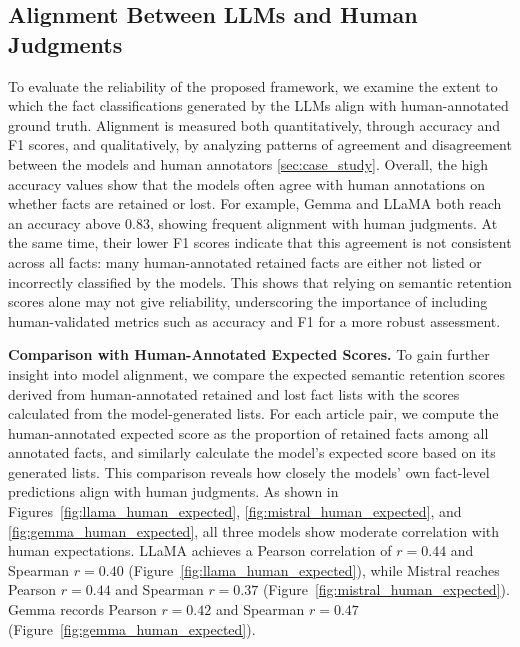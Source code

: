 \documentclass{DESSThesis}
\begin{document}
\vspace{-1.2em}
\subsection{Alignment Between LLMs and Human Judgments}
\label{sec:alignment_llm_human}
\vspace{-1em}
To evaluate the reliability of the proposed framework, we examine the extent to which the fact classifications generated by the LLMs align with human-annotated ground truth. Alignment is measured both quantitatively, through accuracy and F1 scores, and qualitatively, by analyzing patterns of agreement and disagreement between the models and human annotators \autoref{sec:case_study}.
Overall, the high accuracy values show that the models often agree with human annotations on whether facts are retained or lost. For example, Gemma and LLaMA both reach an accuracy above 0.83, showing frequent alignment with human judgments. At the same time, their lower F1 scores indicate that this agreement is not consistent across all facts: many human-annotated retained facts are either not listed or incorrectly classified by the models. This shows that relying on semantic retention scores alone may not give reliability, underscoring the importance of including human-validated metrics such as accuracy and F1 for a more robust assessment.

\indent\textbf{Comparison with Human-Annotated Expected Scores.}
To gain further insight into model alignment, we compare the expected semantic retention scores derived from human-annotated retained and lost fact lists with the scores calculated from the model-generated lists. For each article pair, we compute the human-annotated expected score as the proportion of retained facts among all annotated facts, and similarly calculate the model's expected score based on its generated lists. This comparison reveals how closely the models’ own fact-level predictions align with human judgments. As shown in Figures~\ref{fig:llama_human_expected}, \ref{fig:mistral_human_expected}, and \ref{fig:gemma_human_expected}, all three models show moderate correlation with human expectations. LLaMA achieves a Pearson correlation of $r = 0.44$ and Spearman $r = 0.40$ (Figure~\ref{fig:llama_human_expected}), while Mistral reaches Pearson $r = 0.44$ and Spearman $r = 0.37$ (Figure~\ref{fig:mistral_human_expected}). Gemma records Pearson $r = 0.42$ and Spearman $r = 0.47$ (Figure~\ref{fig:gemma_human_expected}).
\end{document}
